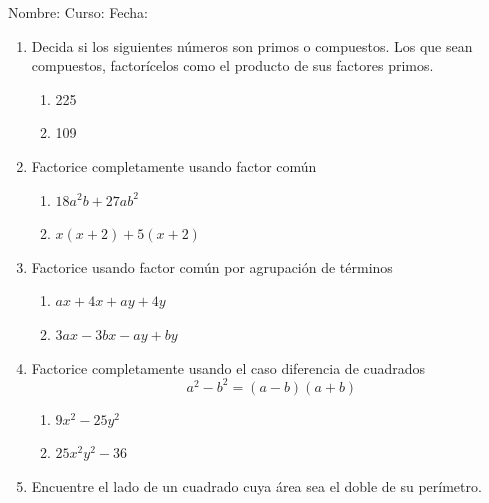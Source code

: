 \documentclass[letterpaper,fleqn]{article}
\newcommand{\LineaNombre}{%
\par
\vspace{\baselineskip}
Nombre:\hrulefill \; Curso: \underline{\hspace*{48pt}} \; Fecha: \underline{\hspace*{2.5cm}} \relax
\par}
\begin{document}
\LineaNombre
\begin{enumerate}
 \item Decida si los siguientes números son primos o compuestos. Los que sean compuestos, factorícelos como el producto de sus factores primos.
 \begin{enumerate}
 \item 225\noanswer
 \item 109 \noanswer
 \end{enumerate}
 \item Factorice completamente usando factor común
 \begin{enumerate}
 \item $18a^{2}b+27ab^{2}$\noanswer
 \item $x(x+2)+5(x+2)$\noanswer
 \end{enumerate}
 \item Factorice usando factor común por agrupación de términos
 \begin{enumerate}
 \item $ax+4x+ay+4y$\noanswer
 \item $3ax-3bx-ay+by$\noanswer
 \end{enumerate}
 \item Factorice completamente usando el caso diferencia de cuadrados
 \[a^{2}-b^{2}=(a-b)(a+b)\]
\begin{enumerate}
\item $9x^{2}-25y^{2}$\noanswer
\item $25x^{2}y^{2}-36$\noanswer
\end{enumerate}
\item Encuentre el lado de un cuadrado cuya área sea el doble de su perímetro.
 \end{enumerate}
\end{document}
